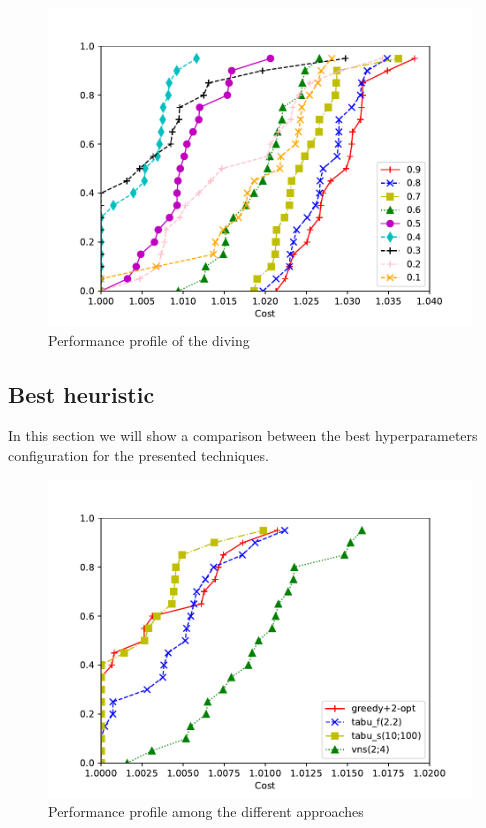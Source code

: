 \documentclass{article}
\begin{document}
\begin{figure}[ht]
        \caption{Performance profile of the diving}
        \label{fig:ht_diving}
        \centering
        \includegraphics[width=340pt]{assets/ht_diving.pdf}
\end{figure}


\clearpage
\newpage
\subsection{Best heuristic}

In this section we will show a comparison between the best hyperparameters
configuration for the presented techniques.

\begin{figure}[ht]
        \caption{Performance profile among the different approaches}
        \label{fig:res_bestheu}
        \centering
        \includegraphics[width=340pt]{assets/res_bestheu.pdf}
\end{figure}
\end{document}
